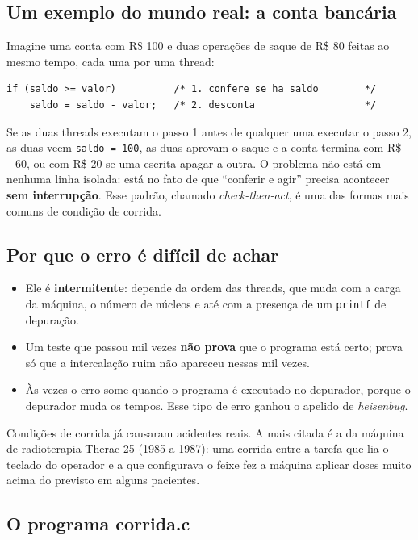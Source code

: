 \documentclass[11pt,a4paper]{article}
\newcommand{\cmd}[1]{\texttt{#1}}
\begin{document}
\subsection{Um exemplo do mundo real: a conta bancária}

Imagine uma conta com R\$ 100 e duas operações de saque de R\$ 80 feitas ao mesmo tempo, cada uma por uma thread:

\begin{lstlisting}[style=codigo]
if (saldo >= valor)          /* 1. confere se ha saldo        */
    saldo = saldo - valor;   /* 2. desconta                   */
\end{lstlisting}

Se as duas threads executam o passo 1 antes de qualquer uma executar o passo 2, as duas veem \cmd{saldo = 100}, as duas aprovam o saque e a conta termina com R\$ $-60$, ou com R\$ 20 se uma escrita apagar a outra. O problema não está em nenhuma linha isolada: está no fato de que ``conferir e agir'' precisa acontecer \textbf{sem interrupção}. Esse padrão, chamado \emph{check-then-act}, é uma das formas mais comuns de condição de corrida.

\subsection{Por que o erro é difícil de achar}

\begin{itemize}
    \item Ele é \textbf{intermitente}: depende da ordem das threads, que muda com a carga da máquina, o número de núcleos e até com a presença de um \cmd{printf} de depuração.
    \item Um teste que passou mil vezes \textbf{não prova} que o programa está certo; prova só que a intercalação ruim não apareceu nessas mil vezes.
    \item Às vezes o erro some quando o programa é executado no depurador, porque o depurador muda os tempos. Esse tipo de erro ganhou o apelido de \emph{heisenbug}.
\end{itemize}

Condições de corrida já causaram acidentes reais. A mais citada é a da máquina de radioterapia Therac-25 (1985 a 1987): uma corrida entre a tarefa que lia o teclado do operador e a que configurava o feixe fez a máquina aplicar doses muito acima do previsto em alguns pacientes.

\subsection{O programa corrida.c}
\end{document}
